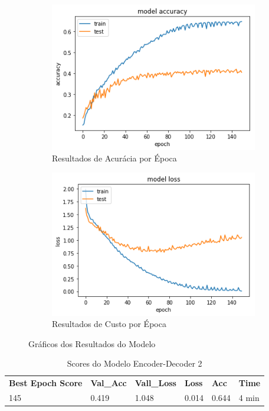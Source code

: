\begin{figure}[h]
  \centering
  \begin{subfigure}[b]{0.45\linewidth}
    \includegraphics[width=\linewidth]{img/enc-dec-2.png}
    \caption{Resultados de Acurácia por Época}
  \end{subfigure}
  \begin{subfigure}[b]{0.45\linewidth}
    \includegraphics[width=\linewidth]{img/enc-dec-2-loss.png}
    \caption{Resultados de Custo por Época}
  \end{subfigure}
  \caption{Gráficos dos Resultados do Modelo}
  \label{fig:plots2}
\end{figure}

\begin{table}[h]
\centering
\begin{tabular}{llllll}
\textbf{Best Epoch Score} & \textbf{Val\_Acc} & \textbf{Vall\_Loss} & \textbf{Loss} & \textbf{Acc} & \textbf{Time} \\
145 & 0.419 & 1.048 & 0.014 & 0.644 & 4 min
\end{tabular}
\caption{Scores do Modelo Encoder-Decoder 2}
\label{tab:res-enc-dec-2}
\end{table}

